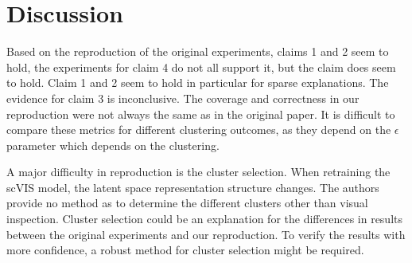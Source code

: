 \section{Discussion}
Based on the reproduction of the original experiments, claims 1 and 2 seem to hold, the experiments for claim 4 do not all support it, but the claim does seem to hold. Claim 1 and 2 seem to hold in particular for sparse explanations. The evidence for claim 3 is inconclusive. The coverage and correctness in our reproduction were not always the same as in the original paper. It is difficult to compare these metrics for different clustering outcomes, as they depend on the $\epsilon$ parameter which depends on the clustering.

A major difficulty in reproduction is the cluster selection. When retraining the scVIS model, the latent space representation structure changes. The authors provide no method as to determine the different clusters other than visual inspection. Cluster selection could be an explanation for the differences in results between the original experiments and our reproduction. To verify the results with more confidence, a robust method for cluster selection might be required. 




%
%
